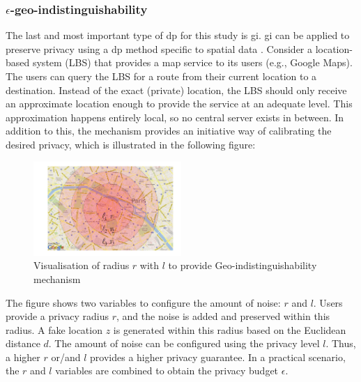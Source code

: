 \subsubsection{$\epsilon$-geo-indistinguishability} \label{theory:geo-indistinguishability}
The last and most important type of \gls{dp} for this study is \gls{gi}.
\gls{gi} can be applied to preserve privacy using a \gls{dp} method specific to spatial data \citep{DBLP:journals/corr/abs-1212-1984}.
Consider a location-based system (LBS) that provides a map service to its users (e.g., Google Maps).
The users can query the LBS for a route from their current location to a destination.
Instead of the exact (private) location, the LBS should only receive an approximate location enough to provide the service at an adequate level.
This approximation happens entirely local, so no central server exists in between. \newline
In addition to this, the mechanism provides an initiative way of calibrating the desired privacy, which is illustrated in the following figure:
\begin{figure}[H]
\centering
  \includegraphics[width=0.5\textwidth]{TheorethicalFramework/geo-indistinguishability.png}
  \caption{Visualisation of radius $r$ with $l$ to provide Geo-indistinguishability mechanism \citep{DBLP:journals/corr/abs-1212-1984}}
  \label{fig:geo-indistinguishability}
\end{figure}
The figure shows two variables to configure the amount of noise: $r$ and $l$.
Users provide a privacy radius $r$, and the noise is added and preserved within this radius.
A fake location $z$ is generated within this radius based on the Euclidean distance $d$.
The amount of noise can be configured using the privacy level $l$.
Thus, a higher $r$ or/and $l$ provides a higher privacy guarantee. \newline
In a practical scenario, the $r$ and $l$ variables are combined to obtain the privacy budget $\epsilon$.
